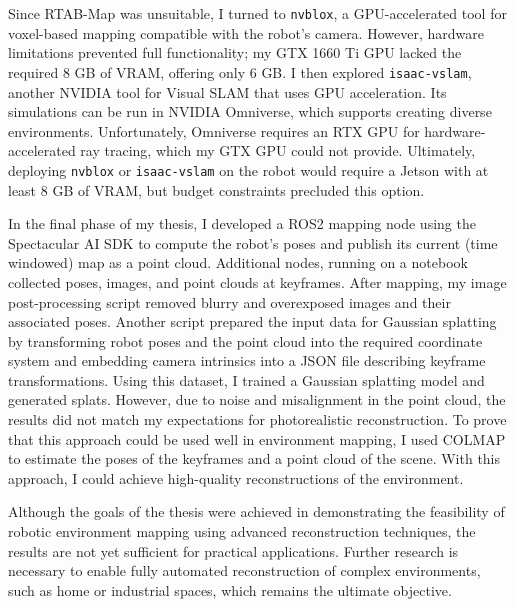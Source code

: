 
Since RTAB-Map was unsuitable, I turned to \verb|nvblox|, a GPU-accelerated tool for voxel-based mapping compatible with the robot's camera. However, hardware limitations prevented full functionality; my GTX 1660 Ti GPU lacked the required 8 GB of VRAM, offering only 6 GB. I then explored \verb|isaac-vslam|, another NVIDIA tool for Visual SLAM that uses GPU acceleration. Its simulations can be run in NVIDIA Omniverse, which supports creating diverse environments. Unfortunately, Omniverse requires an RTX GPU for hardware-accelerated ray tracing, which my GTX GPU could not provide. Ultimately, deploying \verb|nvblox| or \verb|isaac-vslam| on the robot would require a Jetson with at least 8 GB of VRAM, but budget constraints precluded this option.

In the final phase of my thesis, I developed a ROS2 mapping node using the Spectacular AI SDK to compute the robot's poses and publish its current (time windowed) map as a point cloud. Additional nodes, running on a notebook collected poses, images, and point clouds at keyframes. After mapping, my image post-processing script removed blurry and overexposed images and their associated poses. Another script prepared the input data for Gaussian splatting by transforming robot poses and the point cloud into the required coordinate system and embedding camera intrinsics into a JSON file describing keyframe transformations. Using this dataset, I trained a Gaussian splatting model and generated splats. However, due to noise and misalignment in the point cloud, the results did not match my expectations for photorealistic reconstruction. To prove that this approach could be used well in environment mapping, I used COLMAP to estimate the poses of the keyframes and a point cloud of the scene. With this approach, I could achieve high-quality reconstructions of the environment.

Although the goals of the thesis were achieved in demonstrating the feasibility of robotic environment mapping using advanced reconstruction techniques, the results are not yet sufficient for practical applications. Further research is necessary to enable fully automated reconstruction of complex environments, such as home or industrial spaces, which remains the ultimate objective.

